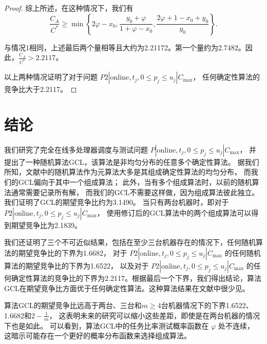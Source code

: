\begin{proof}
综上所述，在这种情况下，我们有
\[
\frac{C_A}{C^*} \geq \min \left\{ 2\varphi - x_0, 
\frac{y_0 + \varphi}{1 + \varphi - x_0}, 
\frac{2\varphi + 1 - x_0 + y_0}{y_0} \right\}.
\]

与情况1相同，上述最后两个量相等且大约为2.21172。第一个量约为2.7482。因此，\(\frac{C_A}{C^*} > 2.2117\)。

以上两种情况证明了对于问题 \( P2 | \text{online}, t_j, 0 \leq p_j \leq u_j | C_{\max} \)，
任何确定性算法的竞争比大于2.2117。

\end{proof}

\section{结论}

我们研究了完全在线多处理器调度与测试问题 \( P | \text{online}, t_j, 0 \leq p_j \leq u_j | C_{\max} \)，
并提出了一种随机算法GCL，该算法是非均匀分布的任意多个确定性算法。
据我们所知，文献中的随机算法作为元算法大多是其组成确定性算法的均匀分布，
而我们的GCL偏向于其中一个组成算法；
此外，当有多个组成算法时，以前的随机算法通常需要记录所有解，
而我们的GCL不需要这样做，因为组成算法彼此独立。
我们证明了GCL的期望竞争比约为3.1490。
当只有两台机器时，即对于 \( P2 | \text{online}, t_j, 0 \leq p_j \leq u_j | C_{\max} \)，
使用修订后的GCL算法中的两个组成算法可以得到期望竞争比为2.1839。

我们还证明了三个不可近似结果，包括在至少三台机器存在的情况下，任何随机算法的期望竞争比的下界为1.6682，
对于 \( P2 | \text{online}, t_j, 0 \leq p_j \leq u_j | C_{\max} \) 的任何随机算法的期望竞争比的下界为1.6522，
以及对于 \( P2 | \text{online}, t_j, 0 \leq p_j \leq u_j | C_{\max} \) 的任何确定性算法的竞争比的下界为2.2117。根据最后一个下界，我们得出结论，算法GCL在期望竞争比方面优于任何确定性算法。这种算法结果在文献中很少见。

算法GCL的期望竞争比远高于两台、三台和\( m \geq 4 \)台机器情况下的下界1.6522、1.6682和\( 2 - \frac{1}{m} \)，
这表明未来的研究可以缩小这些差距，即使是在两台机器的情况下也是如此。
可以看到，算法GCL中的任务比率测试概率函数在 \(\varphi\) 处不连续，
这暗示可能存在一个更好的概率分布函数来选择组成算法。

\begingroup
    \printbibliography[title={外文翻译参考文献}]
\endgroup
